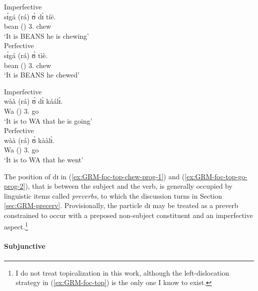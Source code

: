 \begin{exe}
\begin{exe}
\begin{exe}
{\begin{exe}
\begin{exe}
\begin{exe}
\begin{exe}
\begin{exe}
\begin{exe}
\begin{exe}
\begin{exe}
\begin{exe}
\begin{exe}
\begin{exe}
\begin{exe}
\begin{exe}
\begin{exe}
\begin{exe}
\begin{exe}
\begin{exe}
\begin{exe}
\begin{exe}
\begin{multicols}{2}
\ea\label{ex:GRM-foc-top}
 \ea\label{ex:GRM-foc-top-chew-prog-1}{\rm Imperfective}\\
\gll  sɪ́gá (rá)  ʊ̀ dɪ̀  tíē.\\
 bean  ({\foc}) {3.\sg} {\ipfv} chew\\
\glt `It is BEANS he is chewing'\\


 \ex\label{ex:GRM-foc-top-chew-perf-1}{\rm Perfective}\\
\gll  sɪ́gá (rá) ʊ̀   tìè.\\
 bean  ({\foc}) {3.\sg}  chew\\
\glt `It is BEANS he chewed'\\


\columnbreak


 \ex\label{ex:GRM-foc-top-go-prog-2}{\rm Imperfective}\\
\gll   wàà (rá) ʊ̀ dɪ̀  káálɪ̀.\\
Wa ({\foc}) {3.\sg} {\ipfv} go\\
\glt `It is to WA that he is going'\\


 \ex\label{ex:GRM-foc-top-go-perf-2}{\rm Perfective}\\
\gll   wàà (rá)  ʊ̀ kààlɪ̀.\\
Wa   ({\foc}) {3.\sg}  go\\
\glt `It is to WA that he went'\\
\z 
 \z
\end{multicols}

The position of {\sls dɪ} in  
(\ref{ex:GRM-foc-top-chew-prog-1}) and 
(\ref{ex:GRM-foc-top-go-prog-2}), that is between the subject and the verb, is 
generally occupied by linguistic items called  {\it preverbs},  to which the 
discussion turns in Section \ref{sec:GRM-precerv}.  Provisionally, the particle 
{\sls dɪ} may be treated as a preverb constrained to occur with  a preposed  
 non-subject constituent and an imperfective aspect.\footnote{I do not treat 
topicalization in this work, although the left-dislocation strategy in 
(\ref{ex:GRM-foc-top}) is the only one I know to exist.}


\paragraph{Subjunctive}
\label{sec:GRM-subjunctive}


\end{exe}
\end{exe}
\end{exe}
\end{exe}
\end{exe}
\end{exe}
\end{exe}
\end{exe}
\end{exe}
\end{exe}
\end{exe}
\end{exe}
\end{exe}
\end{exe}
\end{exe}
\end{exe}
\end{exe}
\end{exe}
\end{exe}}
\end{exe}
\end{exe}
\end{exe}
